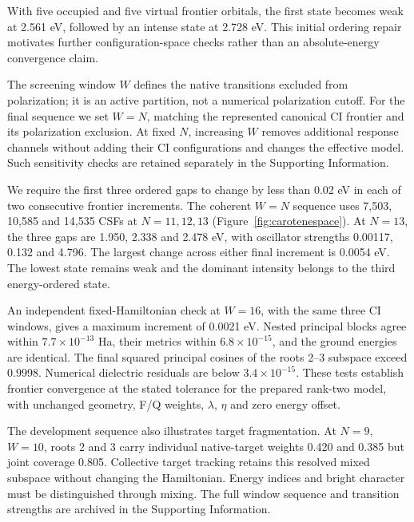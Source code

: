 \documentclass[11pt,a4paper]{article}
\begin{document}
With five occupied and five virtual frontier orbitals, the first state
becomes weak at 2.561 eV, followed by an intense state at 2.728 eV. This initial ordering repair motivates further
configuration-space checks rather than an absolute-energy convergence claim.

The screening window $W$ defines the native transitions excluded from
polarization; it is an active partition, not a numerical polarization cutoff.
For the final sequence we set $W=N$, matching the represented canonical
CI frontier and its polarization exclusion. At fixed $N$, increasing $W$
removes additional response channels without adding their CI configurations
and changes the effective model. Such sensitivity checks are retained
separately in the Supporting Information.

We require the first three ordered gaps to change by less than 0.02 eV
in each of two consecutive frontier increments. The coherent $W=N$
sequence uses 7,503, 10,585 and 14,535 CSFs at $N=11,12,13$
(Figure~\ref{fig:carotenespace}). At $N=13$, the three gaps are
1.950, 2.338 and 2.478 eV, with oscillator strengths 0.00117,
0.132 and 4.796. The largest change across either final increment is
0.0054 eV. The lowest state remains weak and the dominant intensity
belongs to the third energy-ordered state.

An independent fixed-Hamiltonian check at $W=16$, with the same three
CI windows, gives a maximum increment of 0.0021 eV. Nested principal
blocks agree within $7.7\times10^{-13}$ Ha, their metrics within
$6.8\times10^{-15}$, and the ground energies are identical. The final
squared principal cosines of the roots 2--3 subspace exceed 0.9998.
Numerical dielectric residuals are below $3.4\times10^{-15}$.
These tests establish frontier convergence at the stated tolerance for
the prepared rank-two model, with unchanged geometry, F/Q weights,
$\lambda$, $\eta$ and zero energy offset.

The development sequence also illustrates target fragmentation. At
$N=9$, $W=10$, roots 2 and 3 carry individual native-target weights
0.420 and 0.385 but joint coverage 0.805. Collective target tracking
retains this resolved mixed subspace without changing the Hamiltonian.
Energy indices and bright character must be distinguished through mixing.
The full window sequence and transition strengths are archived in the
Supporting Information.
\end{document}
